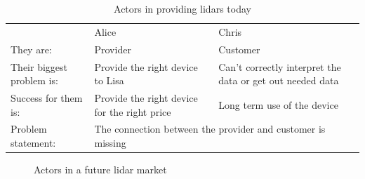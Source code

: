
\begin{table}[!h]
    \centering
    \caption{Actors in providing lidars today}
    \begin{tabular}{@{}|p{}|p{}|p{}|p{}|@{}}
    \rowcolor{Task32Blue2} & Alice & & Chris \\
    They are: &
        Provider &
        &
        Customer \\
    Their biggest problem is: &
        Provide the right device to Lisa & 
        &
        Can't correctly interpret the data or get out needed data \\
    Success for them is: &
        Provide the right device for the right price &
        &
    Long term use of the device \\
    Problem statement: &
        \multicolumn{3}{|p{0.765\textwidth+4\tabcolsep+2\arrayrulewidth}|}{The connection between the provider and customer is missing}
\end{tabular}
\label{tab:04_lidarSolutionsProvider_now}
\end{table}

\begin{figure}
    \centering
    \caption{Actors in a future lidar market}
    \label{fig:02_offshoreforecasting_future}
\end{figure}


